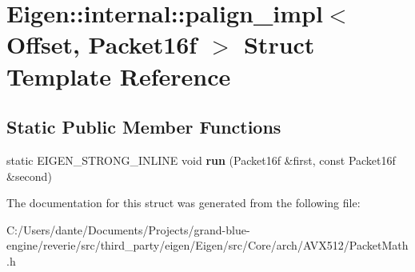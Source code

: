 \hypertarget{struct_eigen_1_1internal_1_1palign__impl_3_01_offset_00_01_packet16f_01_4}{}\section{Eigen\+::internal\+::palign\+\_\+impl$<$ Offset, Packet16f $>$ Struct Template Reference}
\label{struct_eigen_1_1internal_1_1palign__impl_3_01_offset_00_01_packet16f_01_4}
\subsection*{Static Public Member Functions}
\begin{DoxyCompactItemize}
\item 
\mbox{\label{struct_eigen_1_1internal_1_1palign__impl_3_01_offset_00_01_packet16f_01_4_abc1d0f94deb62c40d884c3293a0dbc18}} 
static E\+I\+G\+E\+N\+\_\+\+S\+T\+R\+O\+N\+G\+\_\+\+I\+N\+L\+I\+NE void {\bfseries run} (Packet16f \&first, const Packet16f \&second)
\end{DoxyCompactItemize}


The documentation for this struct was generated from the following file\+:\begin{DoxyCompactItemize}
\item 
C\+:/\+Users/dante/\+Documents/\+Projects/grand-\/blue-\/engine/reverie/src/third\+\_\+party/eigen/\+Eigen/src/\+Core/arch/\+A\+V\+X512/Packet\+Math.\+h\end{DoxyCompactItemize}
